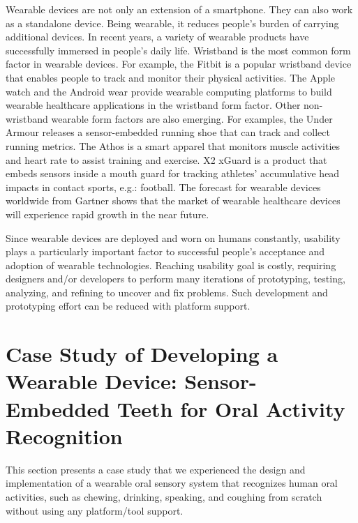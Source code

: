 Wearable devices are not only an extension of a smartphone. They can also work as a standalone device. Being wearable, it reduces people's burden of carrying additional devices. In recent years, a variety of wearable products have successfully immersed in people's daily life. Wristband is the most common form factor in wearable devices. For example, the Fitbit \cite{Fitbit} is a popular wristband device that enables people to track and monitor their physical activities. The Apple watch \cite{Apple_watch} and the Android wear \cite{Android_wear} provide wearable computing platforms to build wearable healthcare applications in the wristband form factor. Other non-wristband wearable form factors are also emerging. For examples, the Under Armour \cite{Under_armour} releases a sensor-embedded running shoe that can track and collect running metrics. The Athos \cite{Athos} is a smart apparel that monitors muscle activities and heart rate to assist training and exercise. X2 xGuard \cite{X2_xGuard, camarillo2013head} is a product that embeds sensors inside a mouth guard for tracking athletes' accumulative head impacts in contact sports, e.g.: football. The forecast for wearable devices worldwide from Gartner \cite{gartner2016wearable} shows that the market of wearable healthcare devices will experience rapid growth in the near future. 


Since wearable devices are deployed and worn on humans constantly, usability plays a particularly important factor to successful people's acceptance and adoption of wearable technologies. Reaching usability goal is costly, requiring designers and/or developers to perform many iterations of prototyping, testing, analyzing, and refining to uncover and fix problems. Such development and prototyping effort can be reduced with platform support. 


\section{Case Study of Developing a Wearable Device: Sensor-Embedded Teeth for Oral Activity Recognition}
This section presents a case study that we experienced the design and implementation of a wearable oral sensory system that recognizes human oral activities, such as chewing, drinking, speaking, and coughing from scratch without using any platform/tool support. 

